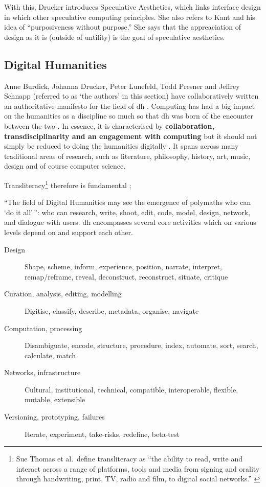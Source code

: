 With this, Drucker introduces Speculative Aesthetics, which links interface design in which other speculative computing principles. She also refers to Kant and his idea of ``purposiveness without purpose.'' She says that the appreaciation of design as it is (outside of untility) is the goal of speculative aesthetics.


\subsection{Digital Humanities}

Anne Burdick, Johanna Drucker, Peter Lunefeld, Todd Presner and Jeff\-rey Schn\-app (referred to as `the authors' in this section) have collaboratively written an authoritative manifesto for the field of \gls{dh} \autocite{Burdick2012}. Computing has had a big impact on the humanities as a discipline so much so that \gls{dh} was born of the encounter between the two \autocite[p.3]{Burdick2012}. In essence, it is characterised by \textbf{collaboration, transdisciplinarity and an engagement with computing} \autocite[p.122]{Burdick2012} but it should not simply be reduced to doing the humanities digitally \autocite[p.101]{Burdick2012}. It spans across many traditional areas of research, such as literature, philosophy, history, art, music, design and of course computer science.

\begin{draft}
  Transliteracy\footnote{Sue Thomas et al.\ define transliteracy as ``the ability to read, write and interact across a range of platforms, tools and media from signing and orality through handwriting, print, TV, radio and film, to digital social networks.'' \autocite{Thomas2007}} therefore is fundamental \autocite{Thomas2007};
\end{draft}

``The field of Digital Humanities may see the emergence of polymaths who can `do it all'\,'': who can research, write, shoot, edit, code, model, design, network, and dialogue with users. \autocite[p.15]{Burdick2012} \gls{dh} encompasses several core activities which on various levels depend on and support each other.

\begin{description}
  \item [Design] Shape, scheme, inform, experience, position, narrate,
  					interpret, remap/reframe, reveal, deconstruct, reconstruct,
  					situate, critique
  \item [Curation, analysis, editing, modelling] Digitise, classify, describe, metadata, organise, navigate
  \item [Computation, processing] Disambiguate, encode, structure, procedure, index, automate, sort, search, calculate, match
  \item [Networks, infrastructure] Cultural, institutional, technical, compatible, interoperable, flexible, mutable, extensible
  \item [Versioning, prototyping, failures]	Iterate, experiment, take-risks, redefine, beta-test
\end{description}

